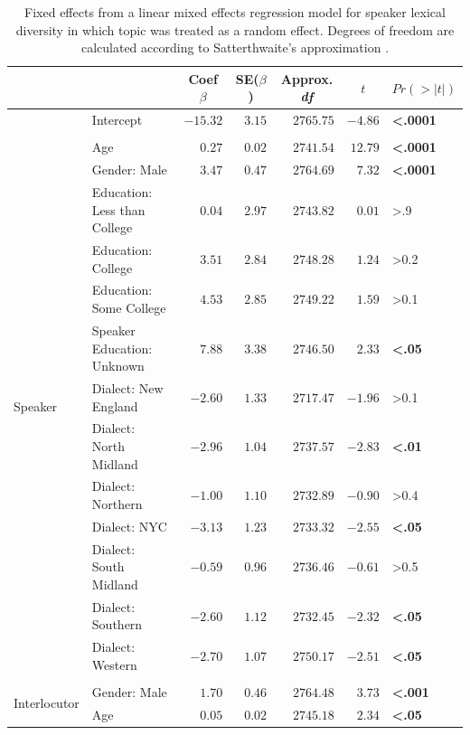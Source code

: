 \documentclass[10pt,letterpaper]{article}
\begin{document}
\begin{table}
\centering
\begin{tabular}{llrrrrl}
\toprule
\multicolumn{2}{l}{}&\multicolumn{1}{c}{Coef $\beta$}&\multicolumn{1}{c}{SE($\beta$)}&\multicolumn{1}{c}{Approx. \textit{df}}&\multicolumn{1}{c}{$t$}&\multicolumn{1}{c}{$Pr(>|t|)$}\tabularnewline
\midrule
& Intercept&$-15.32$&$3.15$&$2765.75$&$-4.86$&\textbf{\textless .0001}\tabularnewline
\hline  \\ [-2ex]
\multirow{13}{*}{Speaker} & Age&$  0.27$&$0.02$&$2741.54$&$12.79$&\textbf{\textless .0001}\tabularnewline
& Gender: Male&$  3.47$&$0.47$&$2764.69$&$ 7.32$&\textbf{\textless .0001}\tabularnewline
& Education: Less than College&$  0.04$&$2.97$&$2743.82$&$ 0.01$&\textgreater .9\tabularnewline
& Education: College&$  3.51$&$2.84$&$2748.28$&$ 1.24$&\textgreater 0.2\tabularnewline
& Education: Some College&$  4.53$&$2.85$&$2749.22$&$ 1.59$&\textgreater 0.1\tabularnewline
& Speaker Education: Unknown&$  7.88$&$3.38$&$2746.50$&$ 2.33$&\textbf{\textless .05}\tabularnewline
& Dialect: New England&$ -2.60$&$1.33$&$2717.47$&$-1.96$&\textgreater 0.1\tabularnewline
& Dialect: North Midland&$ -2.96$&$1.04$&$2737.57$&$-2.83$&\textbf{\textless .01}\tabularnewline
& Dialect: Northern&$ -1.00$&$1.10$&$2732.89$&$-0.90$&\textgreater 0.4\tabularnewline
& Dialect: NYC&$ -3.13$&$1.23$&$2733.32$&$-2.55$&\textbf{\textless .05}\tabularnewline
& Dialect: South Midland&$ -0.59$&$0.96$&$2736.46$&$-0.61$&\textgreater 0.5\tabularnewline
& Dialect: Southern&$ -2.60$&$1.12$&$2732.45$&$-2.32$&\textbf{\textless .05}\tabularnewline
& Dialect: Western&$ -2.70$&$1.07$&$2750.17$&$-2.51$&\textbf{\textless .05}\tabularnewline
\hline  \\ [-2ex]
\multirow{2}{*}{Interlocutor} & Gender: Male&$  1.70$&$0.46$&$2764.48$&$ 3.73$&\textbf{\textless .001}\tabularnewline
& Age&$  0.05$&$0.02$&$2745.18$&$ 2.34$&\textbf{\textless .05}\tabularnewline
\bottomrule
\end{tabular}
\caption{Fixed effects from a linear mixed effects regression model for speaker lexical diversity in which topic was treated as a random effect. Degrees of freedom are calculated according to Satterthwaite's approximation
\citep{satterthwaite1946}.}
\label{lexDivLMER}
\end{table}
\end{document}
